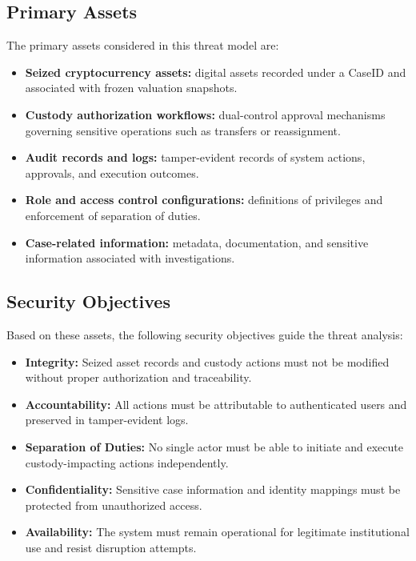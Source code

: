 \documentclass[12pt,a4paper]{report}
\begin{document}
\subsection{Primary Assets}

The primary assets considered in this threat model are:

\begin{itemize}
    \item \textbf{Seized cryptocurrency assets:} digital assets recorded under a CaseID and associated with frozen valuation snapshots.
    \item \textbf{Custody authorization workflows:} dual-control approval mechanisms governing sensitive operations such as transfers or reassignment.
    \item \textbf{Audit records and logs:} tamper-evident records of system actions, approvals, and execution outcomes.
    \item \textbf{Role and access control configurations:} definitions of privileges and enforcement of separation of duties.
    \item \textbf{Case-related information:} metadata, documentation, and sensitive information associated with investigations.
\end{itemize}

\subsection{Security Objectives}

Based on these assets, the following security objectives guide the threat analysis:

\begin{itemize}
    \item \textbf{Integrity:} Seized asset records and custody actions must not be modified without proper authorization and traceability.
    \item \textbf{Accountability:} All actions must be attributable to authenticated users and preserved in tamper-evident logs.
    \item \textbf{Separation of Duties:} No single actor must be able to initiate and execute custody-impacting actions independently.
    \item \textbf{Confidentiality:} Sensitive case information and identity mappings must be protected from unauthorized access.
    \item \textbf{Availability:} The system must remain operational for legitimate institutional use and resist disruption attempts.
\end{itemize}
\end{document}
